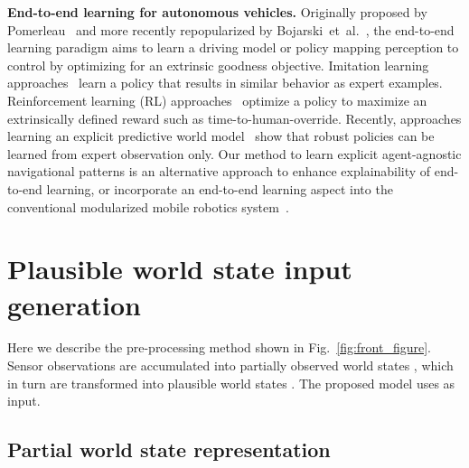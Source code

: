 \documentclass[letterpaper, 10 pt, conference]{ieeeconf}
\begin{document}
\noindent \textbf{End-to-end learning for autonomous vehicles.}
Originally proposed by Pomerleau~\cite{pomerleau1988alvinn} and more recently repopularized by Bojarski~et~al.~\cite{bojarski2016e2e_self_driving}, the end-to-end learning paradigm aims to learn a driving model or policy mapping perception to control by optimizing for an extrinsic goodness objective.
Imitation learning approaches~\cite{bojarski2016e2e_self_driving, amin2018variational_end2end, bansal2018} learn a policy that results in similar behavior as expert examples.
Reinforcement learning (RL) approaches~\cite{kendall2019end2end_deeprl} optimize a policy to maximize an extrinsically defined reward such as time-to-human-override.
Recently, approaches learning an explicit predictive world model~\cite{henaff2019model_predictive_policy_learning, chen2021world_on_rails} show that robust policies can be learned from expert observation only.
Our method to learn explicit agent-agnostic navigational patterns is an alternative approach to enhance explainability of end-to-end learning, or incorporate an end-to-end learning aspect into the conventional modularized mobile robotics system~\cite{krause2013robot_navigation}.












\section{Plausible world state input generation}
\label{sec:plausible_world_state_input_generation}

Here we describe the pre-processing method shown in Fig.~\ref{fig:front_figure}. Sensor observations are accumulated into partially observed world states , which in turn are transformed into plausible world states . The proposed model
uses  as input.

\subsection{Partial world state representation}
\label{sec:partial_world_state_representation}
\end{document}
